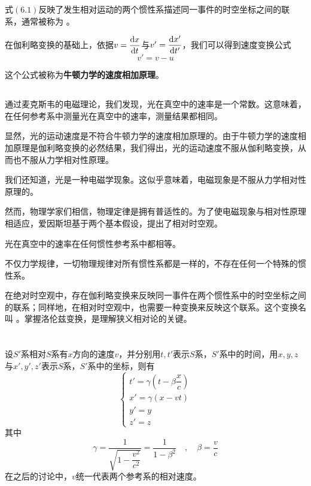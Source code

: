 式$(6.1)$反映了发生相对运动的两个惯性系描述同一事件的时空坐标之间的联系，通常被称为 。

在伽利略变换的基础上，依据$v=\dfrac{\dif x}{\dif t}$与$v'=\dfrac{\dif x'}{\dif t'}$，我们可以得到速度变换公式
\begin{equation}
	v'=v-u
\end{equation}

这个公式被称为\textbf{牛顿力学的速度相加原理}。

\subsection[相对时空观]{}
通过麦克斯韦的电磁理论，我们发现，光在真空中的速率是一个常数。这意味着，在任何参考系中测量光在真空中的速率，测量结果都相同。

显然，光的运动速度是不符合牛顿力学的速度相加原理的。由于牛顿力学的速度相加原理是伽利略变换的必然结果，我们得出，光的运动速度不服从伽利略变换，从而也不服从力学相对性原理。

我们还知道，光是一种电磁学现象。这似乎意味着，电磁现象是不服从力学相对性原理的。

然而，物理学家们相信，物理定律是拥有普适性的。为了使电磁现象与相对性原理相适应，爱因斯坦基于两个基本假设，提出了相对时空观。

\begin{Itemize}
	\item {} 光在真空中的速率在任何惯性参考系中都相等。
	\item {} 不仅力学规律，一切物理规律对所有惯性系都是一样的，不存在任何一个特殊的惯性系。
\end{Itemize}

在绝对时空观中，存在伽利略变换来反映同一事件在两个惯性系中的时空坐标之间的联系；同样地，在相对时空观中，也需要一种变换来反映这个联系。这个变换名叫 。掌握洛伦兹变换，是理解狭义相对论的关键。

\section[洛伦兹变换]{}
\begin {law}
	设$S'$系相对$S$系有$x$方向的速度$v$，并分别用$t,t'$表示$S$系，$S'$系中的时间，用$x,y,z$与$x',y',z'$表示$S$系，$S'$系中的坐标，则有
	\[\left\{\begin{array}{l}
		t'=\gamma(t-\beta\dfrac{x}{c})\\
		x'=\gamma(x-vt)\\
		y'=y\\
		z'=z
	\end{array}\right.\]
  其中
  \[
  	\gamma=\dfrac{1}{\sqrt{1-\dfrac{v^2}{c^2}}} = \dfrac{1}{1-\beta^2}\quad,\quad\beta=\dfrac{v}{c}
  \]
  在之后的讨论中，$v$统一代表两个参考系的相对速度。
\end{law}

